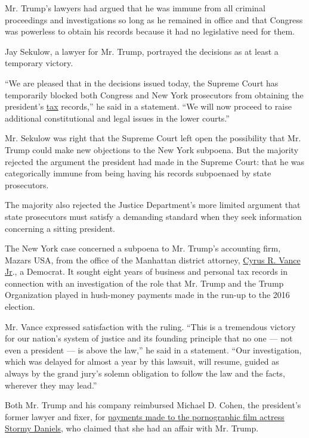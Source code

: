 Mr. Trump's lawyers had argued that he was immune from all criminal
proceedings and investigations so long as he remained in office and that
Congress was powerless to obtain his records because it had no
legislative need for them.

Jay Sekulow, a lawyer for Mr. Trump, portrayed the decisions as at least
a temporary victory.

``We are pleased that in the decisions issued today, the Supreme Court
has temporarily blocked both Congress and New York prosecutors from
obtaining the president's
\href{https://www.nytimes3xbfgragh.onion/2020/07/09/us/politics/trump-taxes.html}{tax}
records,'' he said in a statement. ``We will now proceed to raise
additional constitutional and legal issues in the lower courts.''

Mr. Sekulow was right that the Supreme Court left open the possibility
that Mr. Trump could make new objections to the New York subpoena. But
the majority rejected the argument the president had made in the Supreme
Court: that he was categorically immune from being having his records
subpoenaed by state prosecutors.

The majority also rejected the Justice Department's more limited
argument that state prosecutors must satisfy a demanding standard when
they seek information concerning a sitting president.

The New York case concerned a subpoena to Mr. Trump's accounting firm,
Mazars USA, from the office of the Manhattan district attorney,
\href{https://www.nytimes3xbfgragh.onion/2020/07/10/nyregion/donald-trump-taxes-cy-vance.html}{Cyrus
R. Vance Jr}., a Democrat. It sought eight years of business and
personal tax records in connection with an investigation of the role
that Mr. Trump and the Trump Organization played in hush-money payments
made in the run-up to the 2016 election.

Mr. Vance expressed satisfaction with the ruling. ``This is a tremendous
victory for our nation's system of justice and its founding principle
that no one --- not even a president --- is above the law,'' he said in
a statement. ``Our investigation, which was delayed for almost a year by
this lawsuit, will resume, guided as always by the grand jury's solemn
obligation to follow the law and the facts, wherever they may lead.''

Both Mr. Trump and his company reimbursed Michael D. Cohen, the
president's former lawyer and fixer, for
\href{https://www.nytimes3xbfgragh.onion/2018/05/03/us/politics/stormy-daniels-trump-payment.html}{payments
made to the pornographic film actress Stormy Daniels}, who claimed that
she had an affair with Mr. Trump.

